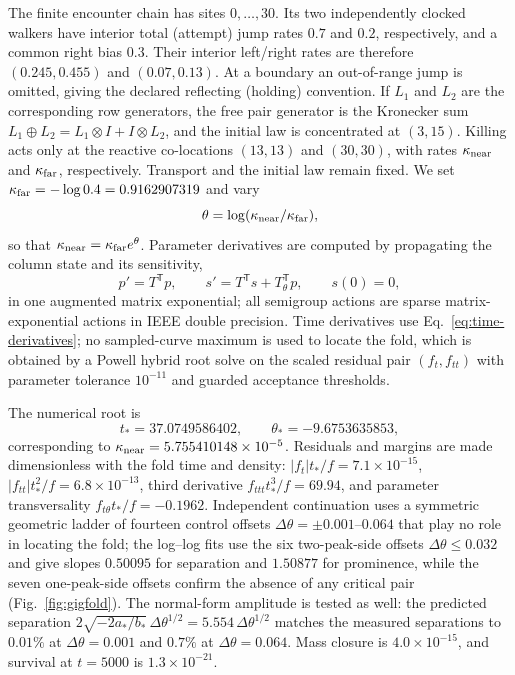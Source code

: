 \documentclass[aps,pre,reprint,amsmath,amssymb,longbibliography,floatfix]{revtex4-2}
\begin{document}
The finite encounter chain has sites \(0,\ldots,30\). Its two independently
clocked walkers have interior total (attempt) jump rates \(0.7\) and \(0.2\),
respectively, and a common right bias \(0.3\). Their interior left/right rates
are therefore
\((0.245,0.455)\) and \((0.07,0.13)\). At a boundary an out-of-range jump is
omitted, giving the declared reflecting (holding) convention. If \(L_1\) and
\(L_2\) are the corresponding row generators, the free pair generator is the
Kronecker sum \(L_1\oplus L_2=L_1\otimes I+I\otimes L_2\), and the initial law
is concentrated at \((3,15)\). Killing acts only at the reactive co-locations
\((13,13)\) and \((30,30)\), with rates \(\kappa_{\rm near}\) and
\(\kappa_{\rm far}\), respectively. Transport and the initial law remain
fixed. We set \(\kappa_{\rm far}=-\log 0.4=0.9162907319\) and vary
\begin{equation}
\theta=\log(\kappa_{\rm near}/\kappa_{\rm far}),
\label{eq:ctmc-control}
\end{equation}
so that \(\kappa_{\rm near}=\kappa_{\rm far}e^\theta\). Parameter derivatives
are computed by propagating the column state and its sensitivity,
\begin{equation}
p'=T^\mathsf Tp,\qquad
s'=T^\mathsf Ts+T_\theta^\mathsf Tp,\qquad s(0)=0,
\label{eq:augmented-sensitivity}
\end{equation}
in one augmented matrix exponential; all semigroup actions are sparse
matrix-exponential actions in IEEE double precision. Time derivatives use
Eq.~\eqref{eq:time-derivatives}; no sampled-curve maximum is used to locate
the fold, which is obtained by a Powell hybrid root solve on the scaled
residual pair \((f_t,f_{tt})\) with parameter tolerance \(10^{-11}\) and
guarded acceptance thresholds.

The numerical root is
\begin{equation}
t_*=37.0749586402,\qquad
\theta_*=-9.6753635853,
\label{eq:ctmc-fold-point}
\end{equation}
corresponding to
\(\kappa_{\rm near}=5.755410148\times10^{-5}\). Residuals and margins are
made dimensionless with the fold time and density:
\(|f_t|t_*/f=7.1\times10^{-15}\),
\(|f_{tt}|t_*^2/f=6.8\times10^{-13}\), third derivative
\(f_{ttt}t_*^3/f=69.94\), and parameter transversality
\(f_{t\theta}t_*/f=-0.1962\). Independent continuation uses a symmetric
geometric ladder of fourteen control offsets
\(\Delta\theta=\pm0.001\)--\(0.064\) that play no role in locating the
fold; the log--log fits use the six two-peak-side offsets
\(\Delta\theta\le0.032\) and give slopes \(0.50095\) for separation and
\(1.50877\) for prominence, while the seven one-peak-side offsets confirm
the absence of any critical pair (Fig.~\ref{fig:gigfold}). The normal-form
amplitude is tested as well: the predicted separation
\(2\sqrt{-2a_*/b_*}\,\Delta\theta^{1/2}=5.554\,\Delta\theta^{1/2}\)
matches the measured separations to \(0.01\%\) at \(\Delta\theta=0.001\)
and \(0.7\%\) at \(\Delta\theta=0.064\). Mass closure is \(4.0\times10^{-15}\), and survival
at \(t=5000\) is \(1.3\times10^{-21}\).
\end{document}
